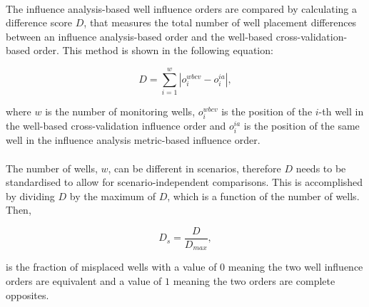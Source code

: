 \documentclass{article}
\begin{document}
\paragraph{}

The influence analysis-based well influence orders are compared by calculating a difference score $D$, that measures the total number of well placement differences between an influence analysis-based order and the well-based cross-validation-based order. This method is shown in the following equation:

\begin{equation}
    D = \sum_{i=1}^w{|o_i^{wbcv} - o_i^{ia}|},
\end{equation}

where $w$ is the number of monitoring wells, $o_i^{wbcv}$ is the position of the $i$-th well in the well-based cross-validation influence order and $o_i^{ia}$ is the position of the same well in the influence analysis metric-based influence order. 

\paragraph{}

The number of wells, $w$, can be different in scenarios, therefore $D$ needs to be standardised to allow for scenario-independent comparisons. This is accomplished by dividing $D$ by the maximum of $D$, which is a function of the number of wells. Then,

\begin{equation}
    D_s = \frac{D}{D_{max}},
\end{equation}

is the fraction of misplaced wells with a value of $0$ meaning the two well influence orders are equivalent and a value of $1$ meaning the two orders are complete opposites.

\printbibliography
\end{document}
